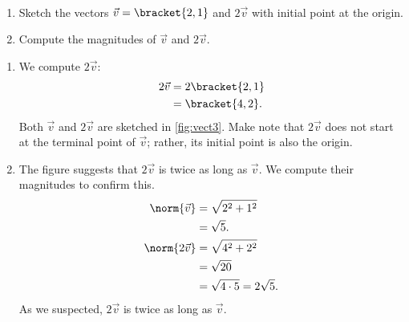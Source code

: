 \begin{example}\label{ex_vect3}
\mbox{}\\[-2\baselineskip]\parbox[t]{\linewidth}{%
\begin{enumerate}
\item	Sketch the vectors $\vec v =\bracket{2,1}$ and  $2\vec v$ with initial point at the origin. 
\item Compute the magnitudes of $\vec v$ and $2\vec v$.
\end{enumerate}}\vspace{0pt}
\solution
\begin{enumerate}
\item	We compute $2\vec v$:
\begin{align*}
	2\vec v &= 2\bracket{2,1}\\
	&=\bracket{4,2}.
\end{align*}
%
%
Both $\vec v$ and $2\vec v$ are sketched in \autoref{fig:vect3}. Make note that $2\vec v$ does not start at the terminal point of $\vec v$; rather, its initial point is also the origin. 
	
\item	The figure suggests that $2\vec v$ is twice as long as $\vec v$. We compute their magnitudes to confirm this.
\begin{align*}
	\norm{\vec v} &= \sqrt{2^2+1^2}\\
	&= \sqrt{5}.\\
	\norm{2\vec v}&=\sqrt{4^2+2^2} \\
	&= \sqrt{20}\\
	&= \sqrt{4\cdot 5} = 2\sqrt{5}.
\end{align*}
As we suspected, $2\vec v$ is twice as long as $\vec v$.
\end{enumerate}
\end{example}


